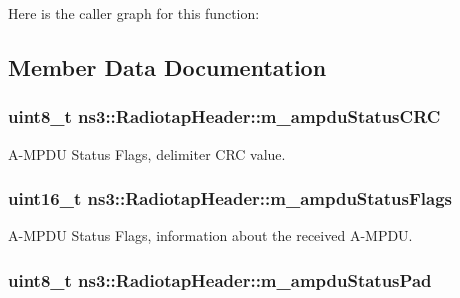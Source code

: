 Here is the caller graph for this function\+:




\subsection{Member Data Documentation}
\subsubsection[{\texorpdfstring{m\+\_\+ampdu\+Status\+C\+RC}{m_ampduStatusCRC}}]{\setlength{\rightskip}{0pt plus 5cm}uint8\+\_\+t ns3\+::\+Radiotap\+Header\+::m\+\_\+ampdu\+Status\+C\+RC\hspace{0.3cm}{\ttfamily [private]}}\hypertarget{classns3_1_1RadiotapHeader_a05ed1ce716402a0c1609a3203d4fbccb}{}\label{classns3_1_1RadiotapHeader_a05ed1ce716402a0c1609a3203d4fbccb}


A-\/\+M\+P\+DU Status Flags, delimiter C\+RC value. 

\subsubsection[{\texorpdfstring{m\+\_\+ampdu\+Status\+Flags}{m_ampduStatusFlags}}]{\setlength{\rightskip}{0pt plus 5cm}uint16\+\_\+t ns3\+::\+Radiotap\+Header\+::m\+\_\+ampdu\+Status\+Flags\hspace{0.3cm}{\ttfamily [private]}}\hypertarget{classns3_1_1RadiotapHeader_a17349b310a739e281683073ee042ceab}{}\label{classns3_1_1RadiotapHeader_a17349b310a739e281683073ee042ceab}


A-\/\+M\+P\+DU Status Flags, information about the received A-\/\+M\+P\+DU. 

\subsubsection[{\texorpdfstring{m\+\_\+ampdu\+Status\+Pad}{m_ampduStatusPad}}]{\setlength{\rightskip}{0pt plus 5cm}uint8\+\_\+t ns3\+::\+Radiotap\+Header\+::m\+\_\+ampdu\+Status\+Pad\hspace{0.3cm}{\ttfamily [private]}}\hypertarget{classns3_1_1RadiotapHeader_a229fb0939d24f5f2ea73c31c228b0fb1}{}\label{classns3_1_1RadiotapHeader_a229fb0939d24f5f2ea73c31c228b0fb1}


